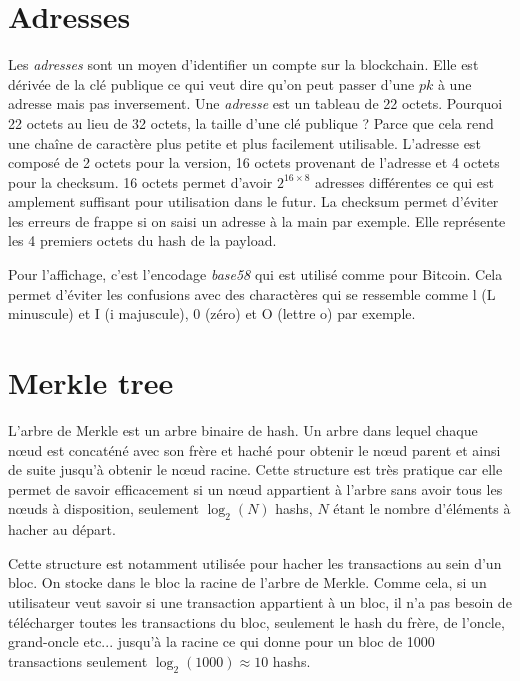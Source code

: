 \section{Adresses}

Les \emph{adresses} sont un moyen d'identifier un compte sur la blockchain. Elle est dérivée de la clé publique ce qui veut dire qu'on peut passer d'une $pk$ à une adresse mais pas inversement. Une \emph{adresse} est un tableau de 22 octets. Pourquoi 22 octets au lieu de 32 octets, la taille d'une clé publique ? Parce que cela rend une chaîne de caractère plus petite et plus facilement utilisable. L'adresse est composé de 2 octets pour la version, 16 octets provenant de l'adresse et 4 octets pour la checksum. 16 octets permet d'avoir $2^{16 \times 8}$ adresses différentes ce qui est amplement suffisant pour utilisation dans le futur. La checksum permet d'éviter les erreurs de frappe si on saisi un adresse à la main par exemple. Elle représente les 4 premiers octets du hash de la payload.


Pour l'affichage, c'est l'encodage \emph{base58} qui est utilisé comme pour Bitcoin. Cela permet d'éviter les confusions avec des charactères qui se ressemble comme l (L minuscule) et I (i majuscule), 0 (zéro) et O (lettre o) par exemple.

\section{Merkle tree}

L'arbre de Merkle est un arbre binaire de hash. Un arbre dans lequel chaque nœud est concaténé avec son frère et haché pour obtenir le nœud parent et ainsi de suite jusqu'à obtenir le nœud racine. Cette structure est très pratique car elle permet de savoir efficacement si un nœud appartient à l'arbre sans avoir tous les nœuds à disposition, seulement $\log_2(N)$ hashs, $N$ étant le nombre d'éléments à hacher au départ.

Cette structure est notamment utilisée pour hacher les transactions au sein d'un bloc. On stocke dans le bloc la racine de l'arbre de Merkle. Comme cela, si un utilisateur veut savoir si une transaction appartient à un bloc, il n'a pas besoin de télécharger toutes les transactions du bloc, seulement le hash du frère, de l'oncle, grand-oncle etc... jusqu'à la racine ce qui donne pour un bloc de 1000 transactions seulement $\log_2(1000) \approx 10$ hashs.

